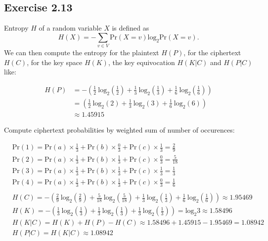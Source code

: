 \documentclass[12pt]{article}
\begin{document}
\subsection*{Exercise 2.13}

Entropy $H$ of a random variable $X$ is defined as
$$
H(X) = - \sum_{v \in V} \text{Pr}(X=v)\text{log}_2\text{Pr}(X=v).
$$
We can then compute the entropy for the plaintext $H(P)$, for the ciphertext $H(C)$, for the key space $H(K)$, the key equivocation $H(K|C)$ and $H(P|C)$ like:

\begin{align*}
H(P) &= - \left(\frac{1}{2} \ \text{log}_2\left(\frac{1}{2}\right) + \frac{1}{3} \ \text{log}_2\left(\frac{1}{3}\right) + \frac{1}{6} \ \text{log}_2\left(\frac{1}{6}\right) \right)\\
&= \left(\frac{1}{2} \ \text{log}_2\left(2\right) + \frac{1}{3} \ \text{log}_2\left(3\right) + \frac{1}{6} \ \text{log}_2\left(6\right) \right)\\
&\approx 1.45915
\end{align*}

Compute ciphertext probabilities by weighted sum of number of occurences:

\begin{align*}
& \text{Pr}(1) = \text{Pr}(a) \times \frac{1}{3} + \text{Pr}(b) \times \frac{0}{3} + \text{Pr}(c) \times \frac{1}{3} = \frac{2}{9}\\
&\text{Pr}(2) = \text{Pr}(a) \times \frac{1}{3} + \text{Pr}(b) \times \frac{1}{3} + \text{Pr}(c) \times \frac{0}{3} = \frac{5}{18}\\
&\text{Pr}(3) = \text{Pr}(a) \times \frac{1}{3} + \text{Pr}(b) \times \frac{1}{3} + \text{Pr}(c) \times \frac{1}{3} = \frac{1}{3}\\
&\text{Pr}(4) = \text{Pr}(a) \times \frac{1}{3} + \text{Pr}(b) \times \frac{1}{3} + \text{Pr}(c) \times \frac{0}{3} = \frac{1}{6}\\
\\
& H(C) = - \left(\frac{2}{9} \ \text{log}_2\left(\frac{2}{9}\right) + \frac{5}{18} \ \text{log}_2\left(\frac{5}{18}\right) + \frac{1}{3} \ \text{log}_2\left(\frac{1}{3}\right) + \frac{1}{6} \ \text{log}_2\left(\frac{1}{6}\right) \right) \approx 1.95469\\
& H(K) = -\left( \frac{1}{3} \ \text{log}_2\left(\frac{1}{3}\right) + \frac{1}{3} \ \text{log}_2\left(\frac{1}{3}\right) + \frac{1}{3} \ \text{log}_2\left(\frac{1}{3}\right) \right) = \text{log}_2 3 \approx 1.58496\\
& H(K|C) = H(K) + H(P) - H(C) \approx 1.58496 + 1.45915 - 1.95469 = 1.08942\\
& H(P|C) = H(K|C) \approx 1.08942
\end{align*}
\end{document}
